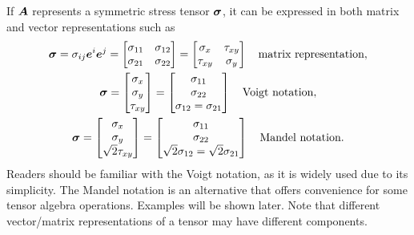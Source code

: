 If $\bm{A}$ represents a symmetric stress tensor $\bm{\sigma}$, it can be expressed in both matrix and vector representations such as
\begin{gather}\label{eq:tensor_stress}
\bm{\sigma}=\sigma_{ij}\bm{e}^i\bm{e}^j=\begin{bmatrix}
\sigma_{11}&\sigma_{12}\\
\sigma_{21}&\sigma_{22}
\end{bmatrix}=\begin{bmatrix}
\sigma_x&\tau_{xy}\\
\tau_{xy}&\sigma_y
\end{bmatrix}\quad\text{matrix representation},\\
\bm{\sigma}=\begin{bmatrix}
\sigma_x\\\sigma_y\\\tau_{xy}
\end{bmatrix}=\begin{bmatrix}
\sigma_{11}\\\sigma_{22}\\\sigma_{12}=\sigma_{21}
\end{bmatrix}\quad\text{Voigt notation},\\
\bm{\sigma}=\begin{bmatrix}
\sigma_x\\\sigma_y\\\sqrt{2}\tau_{xy}
\end{bmatrix}=\begin{bmatrix}
\sigma_{11}\\\sigma_{22}\\\sqrt{2}\sigma_{12}=\sqrt{2}\sigma_{21}
\end{bmatrix}\quad\text{Mandel notation}.
\end{gather}
Readers should be familiar with the Voigt notation, as it is widely used due to its simplicity.
The Mandel notation is an alternative that offers convenience for some tensor algebra operations.
Examples will be shown later.
Note that different vector/matrix representations of a tensor may have different components.

